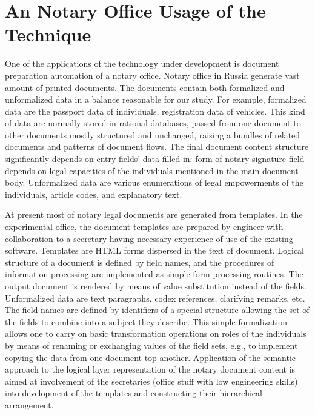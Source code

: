 \documentclass[conference]{IEEEtran}
\begin{document}



\section{An Notary Office Usage of the Technique}

One of the applications of the technology under development is
document preparation automation of a notary office.  Notary office in
Russia generate vast amount of printed documents.  The documents
contain both formalized and unformalized data in a balance reasonable
for our study.  For example, formalized data are the passport data of
individuals, registration data of vehicles.  This kind of data are
normally stored in rational databases, passed from one document to
other documents mostly structured and unchanged, raising a bundles of
related documents and patterns of document flows.  The final document
content structure significantly depends on entry fields’ data filled
in: form of notary signature field depends on legal capacities of the
individuals mentioned in the main document body.
Unformalized data are various enumerations of legal empowerments of
the individuals, article codes, and explanatory text.

At present most of notary legal documents are generated from
templates.  In the experimental office, the document templates are
prepared by engineer with collaboration to a secretary having
necessary experience of use of the existing software.  Templates are
HTML forms dispersed in the text of document.  Logical structure of a
document is defined by field names, and the procedures of information
processing are implemented as simple form processing routines.  The
output document is rendered by means of value substitution instead of
the fields.  Unformalized data are text paragraphs, codex references,
clarifying remarks, etc.  The field names are defined by identifiers
of a special structure allowing the set of the fields to combine into
a subject they describe.  This simple formalization allows one to
carry on basic transformation operations on roles of the individuals
by means of renaming or exchanging values of the field sets, e.g., to
implement copying the data from one document top another.  Application
of the semantic approach to the logical layer representation of the
notary document content is aimed at involvement of the secretaries
(office stuff with low engineering skills) into development of the
templates and constructing their hierarchical arrangement.
\end{document}

